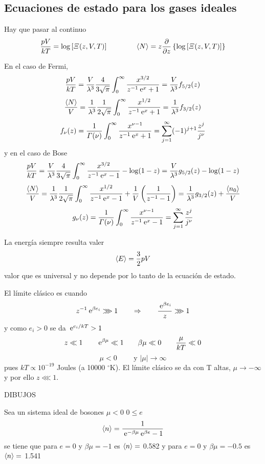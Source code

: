 \documentclass[10pt,oneside]{CBFT_book}
\begin{document}
\subsection{Ecuaciones de estado para los gases ideales}

Hay que pasar al continuo
\[
	\frac{pV}{kT} = \log \left[ \Xi (z,V,T) \right] \qquad \qquad 
	\braket{N} = z\frac{\partial^{\hspace{-0.05em}} {}}{\partial {z}^{\hspace{-0.05em}}}\left\{ \log \left[ \Xi (z,V,T) \right] \right\}
\]

En el caso de Fermi,
\[
	\frac{pV}{kT} = \frac{V}{\lambda^3} \frac{4}{3\sqrt{\pi}} \int_0^\infty 
	\frac{x^{3/2}}{z^{-1}\:\mathrm{e}^x + 1} = \frac{V}{\lambda^3} f_{5/2}(z)
\]
\[
	\frac{\braket{N}}{V} = \frac{1}{\lambda^3} \frac{1}{2\sqrt{\pi}} \int_0^\infty 
	\frac{x^{1/2}}{z^{-1}\:\mathrm{e}^x + 1} = \frac{1}{\lambda^3} f_{3/2}(z)
\]
\[
	f_\nu(z) = \frac{1}{\Gamma(\nu)} \int_0^\infty \frac{x^{\nu - 1}}{z^{-1}\:\mathrm{e}^x + 1} =
	\sum_{j=1}^\infty (-1)^{j+1} \frac{z^j}{j^\nu}
\]
y en el caso de Bose
\[
	\frac{pV}{kT} = \frac{V}{\lambda^3} \frac{4}{3\sqrt{\pi}} \int_0^\infty 
	\frac{x^{3/2}}{z^{-1}\:\mathrm{e}^x - 1} - \log ( 1 - z ) = 
	\frac{V}{\lambda^3} g_{5/2}(z) - \log ( 1 - z )
\]
\[
	\frac{\braket{N}}{V} = \frac{1}{\lambda^3} \frac{1}{2\sqrt{\pi}} \int_0^\infty 
	\frac{x^{1/2}}{z^{-1}\:\mathrm{e}^x - 1} + \frac{1}{V} \left( \frac{ 1 }{ z^{-1} - 1 } \right) = 
	\frac{1}{\lambda^3} g_{3/2}(z) + \frac{\braket{n_0}}{V}
\]
\[
	g_\nu(z) = \frac{1}{\Gamma(\nu)} \int_0^\infty \frac{x^{\nu - 1}}{z^{-1}\:\mathrm{e}^x - 1} =
	\sum_{j=1}^\infty \frac{z^j}{j^\nu}
\]



La energía siempre resulta valer
\[
	\braket{E} = \frac{3}{2}pV
\]
valor que es universal y no depende por lo tanto de la ecuación de estado.

El límite clásico es cuando 
\[
	z^{-1}\:\mathrm{e}^{\beta e_i} \ggg 1 \qquad \Rightarrow \qquad \frac{\:\mathrm{e}^{\beta e_i}}{z} \ggg 1
\]
y como $ e_i > 0 $ se da $ \:\mathrm{e}^{e_i/kT} > 1 $
\[
	z \ll 1 \qquad \:\mathrm{e}^{\beta\mu} \ll 1 \qquad \beta\mu \ll 0 \qquad \frac{\mu}{kT} \ll 0
\]
\[
	\mu < 0 \qquad \text{ y } |\mu| \to \infty 
\]
pues $ kT \propto 10^{-19} $ Joules (a 10000 $^\circ$K).
El límite clásico se da con T altas, $ \mu \to -\infty $ y por ello $ z \lll 1$.

DIBUJOS

Sea un sistema ideal de bosones $ \mu < 0 $ $ 0 \leq e $
\[
	\braket{n} = \frac{1}{ \:\mathrm{e}^{-\beta\mu} \:\mathrm{e}^{\beta e} - 1 }
\]
se tiene que para $ e=0 $ y $ \beta\mu = -1 $ es $ \braket{n} = $ 0.582 y para $ e=0 $ y $ \beta\mu = -0.5 $
es $ \braket{n} = $ 1.541
\end{document}
